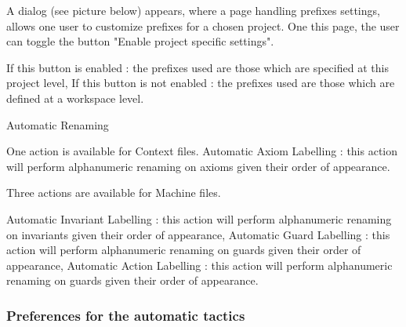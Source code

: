 A dialog (see picture below) appears, where a page handling prefixes settings, allows one user to customize prefixes for a chosen project. One this page, the user can toggle the button "Enable project specific settings".

    If this button is enabled :
        the prefixes used are those which are specified at this project level, 
    If this button is not enabled :
        the prefixes used are those which are defined at a workspace level. 


Automatic Renaming

    One action is available for Context files.
        Automatic Axiom Labelling : this action will perform alphanumeric renaming on axioms given their order of appearance.
 

Three actions are available for Machine files.

    Automatic Invariant Labelling : this action will perform alphanumeric renaming on invariants given their order of appearance,
    Automatic Guard Labelling : this action will perform alphanumeric renaming on guards given their order of appearance,
    Automatic Action Labelling : this action will perform alphanumeric renaming on guards given their order of appearance. 


\subsubsection{Preferences for the automatic tactics}

